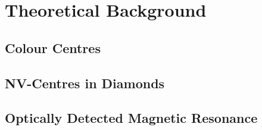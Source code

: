 \section{Theoretical Background}

\subsection{Colour Centres}

\subsection{NV-Centres in Diamonds}

\subsection{Optically Detected Magnetic Resonance}